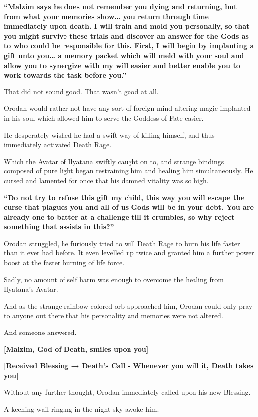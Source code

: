 \documentclass[a4paper,10pt]{book}
\begin{document}
\textbf{“Malzim says he does not remember you dying and returning, but from what your memories show… you return through time immediately upon death. I will train and mold you personally, so that you might survive these trials and discover an answer for the Gods as to who could be responsible for this. First, I will begin by implanting a gift unto you… a memory packet which will meld with your soul and allow you to synergize with my will easier and better enable you to work towards the task before you.”}\par
That did not sound good. That wasn’t good at all.\par
Orodan would rather not have any sort of foreign mind altering magic implanted in his soul which allowed him to serve the Goddess of Fate easier.\par
He desperately wished he had a swift way of killing himself, and thus immediately activated Death Rage.\par
Which the Avatar of Ilyatana swiftly caught on to, and strange bindings composed of pure light began restraining him and healing him simultaneously. He cursed and lamented for once that his damned vitality was so high.\par
\textbf{“Do not try to refuse this gift my child, this way you will escape the curse that plagues you and all of us Gods will be in your debt. You are already one to batter at a challenge till it crumbles, so why reject something that assists in this?”}\par
Orodan struggled, he furiously tried to will Death Rage to burn his life faster than it ever had before. It even levelled up twice and granted him a further power boost at the faster burning of life force.\par
Sadly, no amount of self harm was enough to overcome the healing from Ilyatana’s Avatar.\par
And as the strange rainbow colored orb approached him, Orodan could only pray to anyone out there that his personality and memories were not altered.\par
And someone answered.\par
\textbf{[Malzim, God of Death, smiles upon you]}\par
\textbf{[Received Blessing → Death’s Call - Whenever you will it, Death takes you]}\par
Without any further thought, Orodan immediately called upon his new Blessing.\par
\par
A keening wail ringing in the night sky awoke him.\par
\end{document}
